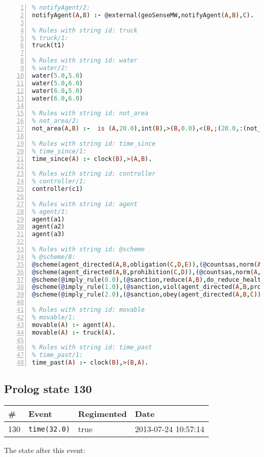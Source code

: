 \documentclass[11pt]{article}\usepackage[utf8]{inputenc}\usepackage{geometry}
\begin{document}
\begin{lstlisting}[language=Prolog, numbers=left]
% Rules with string id: notifyAgent
% notifyAgent/2:
notifyAgent(A,B) :- @external(geoSenseMW,notifyAgent(A,B),C).

% Rules with string id: truck
% truck/1:
truck(t1)

% Rules with string id: water
% water/2:
water(5.0,5.0)
water(5.0,6.0)
water(6.0,5.0)
water(6.0,6.0)

% Rules with string id: not_area
% not_area/2:
not_area(A,B) :-  is (A,20.0),int(B),>(B,0.0),<(B,;(20.0,:(not_area(A,B), is (-(B),20.0)))),int(A),>(A,0.0),<(A,;(20.0,:(area(A,B),-(int(A))))),int(B),>(A,0.0),>(B,0.0),<(A,21.0),<(B,21.0).

% Rules with string id: time_since
% time_since/1:
time_since(A) :- clock(B),>(A,B).

% Rules with string id: controller
% controller/1:
controller(c1)

% Rules with string id: agent
% agent/1:
agent(a1)
agent(a2)
agent(a3)

% Rules with string id: @scheme
% @scheme/8:
@scheme(agent_directed(A,B,obligation(C,D,E)),(@countsas,norm(A,B,F,obligation(C,D,E)),F),false,(listTrue(C)),(time_past(D)),false,[plus(viol(agent_directed(A,B,obligation(C,D,E))))|[]],[plus(obey(agent_directed(A,B,obligation(C,D,E))))|[]])
@scheme(agent_directed(A,B,prohibition(C,D)),(@countsas,norm(A,B,E,prohibition(C,D)),E),(listTrue(C)),false,(false),false,[plus(viol(agent_directed(A,B,prohibition(C,D))))|[]],[plus(obey(agent_directed(A,B,prohibition(C,D))))|[]])
@scheme(@imply_rule(0.0),(@sanction,reduce(A,B),do_reduce_health(A,B),notifyAgent(A,changed(status))),true,false,false,false,[min(reduce(A,B))|[]],[])
@scheme(@imply_rule(1.0),(@sanction,viol(agent_directed(A,B,prohibition(C,D))),do_sanction(D)),true,false,false,false,[min(viol(agent_directed(A,B,prohibition(C,D))))|[]],[])
@scheme(@imply_rule(2.0),(@sanction,obey(agent_directed(A,B,C))),true,false,false,false,[min(obey(agent_directed(A,B,C)))|[]],[])

% Rules with string id: movable
% movable/1:
movable(A) :- agent(A).
movable(A) :- truck(A).

% Rules with string id: time_past
% time_past/1:
time_past(A) :- clock(B),>(B,A).

\end{lstlisting}
\clearpage 
\subsection{Prolog state 130}
\begin{table}[ht]
\centering 
\begin{tabular}{l l l l} 
\textbf{\#} & \textbf{Event} & \textbf{Regimented} & \textbf{Date} \\ [0.5ex] 
\hline
130&\texttt{time(32.0)}&true&2013-07-24 10:57:14\\ [1ex] \hline\end{tabular}
\end{table}
The state after this event:
\end{document}
